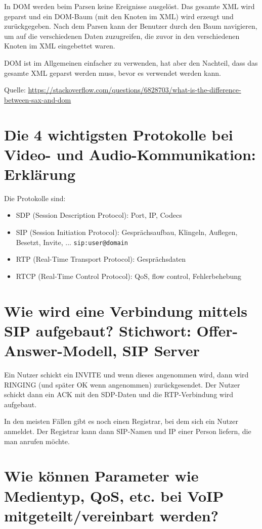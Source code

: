 \documentclass{article}
\begin{document}
	In DOM werden beim Parsen keine Ereignisse ausgelöst. Das gesamte XML wird geparst und ein DOM-Baum (mit den Knoten im XML) wird erzeugt und zurückgegeben. Nach dem Parsen kann der Benutzer durch den Baum navigieren, um auf die verschiedenen Daten zuzugreifen, die zuvor in den verschiedenen Knoten im XML eingebettet waren.
	
	DOM ist im Allgemeinen einfacher zu verwenden, hat aber den Nachteil, dass das gesamte XML geparst werden muss, bevor es verwendet werden kann.
	
	Quelle: \url{https://stackoverflow.com/questions/6828703/what-is-the-difference-between-sax-and-dom}
	
	\section*{Die 4 wichtigsten Protokolle bei Video- und Audio-Kommunikation: Erklärung}
	
	Die Protokolle sind:
	\begin{itemize}
		\item SDP (Session Description Protocol): Port, IP, Codecs
		\item SIP (Session Initiation Protocol): Gesprächsaufbau, Klingeln, Auflegen, Besetzt, Invite, ... \texttt{sip:user@domain}
		\item RTP (Real-Time Transport Protocol): Gesprächsdaten
		\item RTCP (Real-Time Control Protocol): QoS, flow control, Fehlerbehebung
	\end{itemize}
	
	\section*{Wie wird eine Verbindung mittels SIP aufgebaut? Stichwort: Offer-Answer-Modell, SIP Server}
	
	Ein Nutzer schickt ein INVITE und wenn dieses angenommen wird, dann wird RINGING (und später OK wenn angenommen) zurückgesendet. Der Nutzer schickt dann ein ACK mit den SDP-Daten und die RTP-Verbindung wird aufgebaut.
	
	In den meisten Fällen gibt es noch einen Registrar, bei dem sich ein Nutzer anmeldet. Der Registrar kann dann SIP-Namen und IP einer Person liefern, die man anrufen möchte.
	
	\section*{Wie können Parameter wie Medientyp, QoS, etc. bei VoIP mitgeteilt/vereinbart werden?}
	
\end{document}
